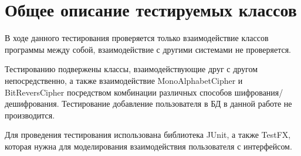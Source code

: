 \documentclass[a4paper,12pt]{article}
\begin{document}
\newpage\section{Общее описание тестируемых классов}
В ходе данного тестирования проверяется только взаимодействие классов программы между собой, взаимодействие с другими системами не проверяется.

Тестированию подвержены классы, взаимодействующие друг с другом непосредственно, а также взаимодействие MonoAlphabetCipher и BitReversCipher посредством комбинации различных способов шифрования/дешифрования.
Тестирование добавление пользователя в БД в данной работе не производится.

Для проведения тестирования использована библиотека JUnit, а также TestFX, которая нужна для моделирования взаимодействия пользователя с интерфейсом.
\end{document}
